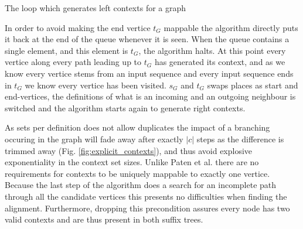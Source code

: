 \documentclass[thesis.tex]{subfiles}
\begin{document}
\begin{center}
  \begin{algorithm}[!t]
    \begin{mdframed}
    \end{mdframed}
    \caption{The loop which generates left contexts for a graph}
  \end{algorithm}
\end{center}
\par\noindent
In order to avoid making the end vertice $t_G$ mappable the algorithm directly puts it back at the end of the queue whenever it is seen. When the queue contains a single element, and this element is $t_G$, the algorithm halts. At this point every vertice along every path leading up to $t_G$ has generated its context, and as we know every vertice stems from an input sequence and every input sequence ends in $t_G$ we know every vertice has been visited. $s_G$ and $t_G$ swaps places as start and end-vertices, the definitions of what is an incoming and an outgoing neighbour is switched and the algorithm starts again to generate right contexts.\\
\par\noindent
As sets per definition does not allow duplicates the impact of a branching occuring in the graph will fade away after exactly $|c|$ steps as the difference is trimmed away (Fig. \ref{fig:explicit_contexts}), and thus avoid explosive exponentiality in the context set sizes. Unlike Paten et al. \cite{mapping_to_a_reference_genome_structure} there are no requirements for contexts to be uniquely mappable to exactly one vertice. Because the last step of the algorithm does a search for an incomplete path through all the candidate vertices this presents no difficulties when finding the alignment. Furthermore, dropping this precondition assures every node has two valid contexts and are thus present in both suffix trees.\\
\end{document}
